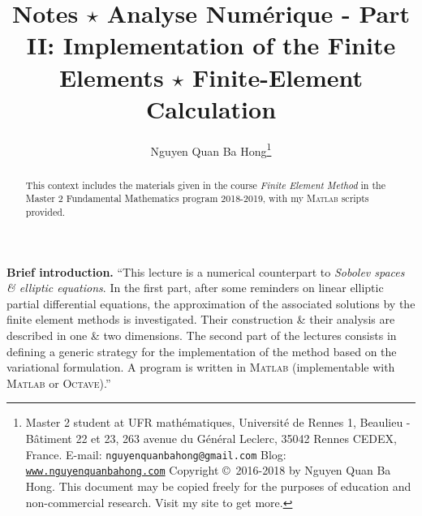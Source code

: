 \documentclass[11pt,a4paper,center,notitlepage]{article}
\title{Notes $\star$ Analyse Num\'erique - Part II: Implementation of the Finite Elements $\star$ Finite-Element Calculation}
\author{Nguyen Quan Ba Hong\footnote{Master 2 student at UFR math\'ematiques, Universit\'e de Rennes 1, Beaulieu - B\^atiment 22 et 23, 263 avenue du G\'en\'eral Leclerc, 35042 Rennes CEDEX, France.\newline
E-mail: \texttt{nguyenquanbahong@gmail.com} \newline
Blog: \texttt{\url{www.nguyenquanbahong.com}} \newline 
Copyright \copyright\ 2016-2018 by Nguyen Quan Ba Hong. This document may be copied freely for the purposes of education and non-commercial research. Visit my site to get more.}}
\numberwithin{equation}{section}
\begin{document}
\maketitle
\begin{abstract}
This context includes the materials given in the course \textit{Finite Element Method} in the Master 2 Fundamental Mathematics program 2018-2019, with my \textsc{Matlab} scripts provided.
\end{abstract}
%
\maketitle
\textbf{Brief introduction.} ``This lecture is a numerical counterpart to \textit{Sobolev spaces \& elliptic equations}. In the first part, after some reminders on linear elliptic partial differential equations, the approximation of the associated solutions by the finite element methods is investigated. Their construction \& their analysis are described in one \& two dimensions. The second part of the lectures consists in defining a generic strategy for the implementation of the method based on the variational formulation. A program is written in \textsc{Matlab} (implementable with \textsc{Matlab} or \textsc{Octave}).''
\newpage
\tableofcontents
\newpage
\end{document}
